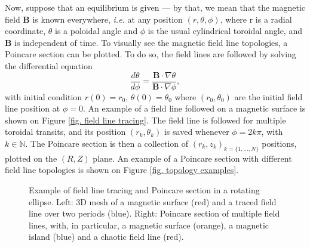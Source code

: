 \documentclass[my_thesis.tex]{subfiles}
\begin{document}
Now, suppose that an equilibrium is given --- by that, we mean that the magnetic field $\mathbf{B}$ is known everywhere, \textit{i.e.} at any position $(r,\theta,\phi)$, where r is a radial coordinate, $\theta$ is a poloidal angle and $\phi$ is the usual cylindrical toroidal angle, and $\mathbf{B}$ is independent of time. To visually see the magnetic field line topologies, a Poincare section can be plotted. To do so, the field lines are followed by solving the differential equation
\begin{equation}
	\frac{d\theta}{d\phi} = \frac{\mathbf{B}\cdot\nabla\theta}{\mathbf{B}\cdot\nabla\phi},
\end{equation}
with initial condition $r(0)=r_0$, $\theta(0)=\theta_0$ where $(r_0,\theta_0)$ are the initial field line position at $\phi=0$. An example of a field line followed on a magnetic surface is shown on Figure \ref{fig. field line tracing}. The field line is followed for multiple toroidal transits, and its position $(r_k,\theta_k)$ is saved whenever $\phi=2k\pi$, with $k\in\mathbb{N}$. The Poincare section is then a collection of $(r_k,z_k)_{k=\{1,\ldots,N\}}$ positions, plotted on the $(R,Z)$ plane. An example of a Poincare section with different field line topologies is shown on Figure \ref{fig. topology examples}.

\begin{figure}
	\centering
	\hfill
	\caption{Example of field line tracing and Poincare section in a rotating ellipse. Left: 3D mesh of a magnetic surface (red) and a traced field line over two periods (blue). Right: Poincare section of multiple field lines, with, in particular, a magnetic surface (orange), a magnetic island (blue) and a chaotic field line (red).}
	\label{fig poincare section}
\end{figure}
\end{document}
